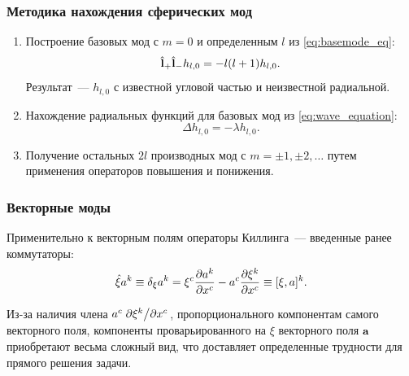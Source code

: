\documentclass{beamer}
\begin{document}

    \begin{frame}\frametitle{Методика нахождения сферических мод}

        \begin{enumerate}
            \item Построение базовых мод с $m = 0$ и определенным $l$ из \autoref{eq:basemode_eq}:
            \begin{equation*}
                \hat{\mathbf{l}}_{+} \hat{\mathbf{l}}_{-} h_{l, 0} = - l (l + 1) h_{l, 0} .
            \end{equation*}
            Результат~--- $h_{l, 0}$ с известной угловой частью и неизвестной радиальной.

            \item Нахождение радиальных функций для базовых мод из \autoref{eq:wave_equation}:
            \begin{equation*}
                \Delta h_{l, 0} = - \lambda h_{l, 0} .
            \end{equation*}

            \item Получение остальных $2l$ производных мод с $m = \pm 1, \pm 2, \dots$ путем применения операторов повышения и понижения.

        \end{enumerate}

    \end{frame}


    \begin{frame}\frametitle{Векторные моды}

        Применительно к векторным полям операторы Киллинга~--- введенные ранее коммутаторы:
        \begin{equation}\label{eq:killing_operator}
            \hat{\mathbf{\xi}} a^k
                \equiv \delta_\xi a^k
                = \xi^c \pdv{a^k}{x^c} - a^c \pdv{\xi^k}{x^c}
                \equiv [\xi, a]^k .
        \end{equation}

        Из-за наличия члена $a^c \pdv*{\xi^k}{x^c}$, пропорционального компонентам самого векторного поля, компоненты проварьированного на $\xi$ векторного поля $\vb{a}$ приобретают весьма сложный вид, что доставляет определенные трудности для прямого решения задачи.

    \end{frame}
\end{document}
